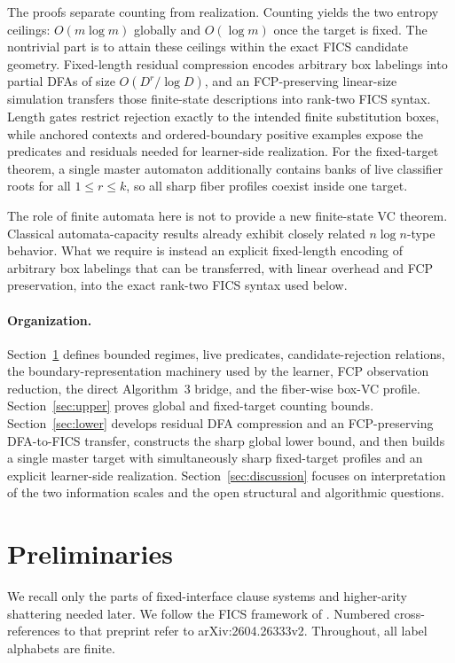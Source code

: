 \documentclass[11pt]{article}
\theoremstyle{definition}
\theoremstyle{remark}
\begin{document}
The proofs separate counting from realization.  Counting yields the two
entropy ceilings: \(O(m\log m)\) globally and \(O(\log m)\) once the target is
fixed.  The nontrivial part is to attain these ceilings within the exact FICS
candidate geometry.  Fixed-length residual compression encodes arbitrary box
labelings into partial DFAs of size \(O(D^r/\log D)\), and an FCP-preserving
linear-size simulation transfers those finite-state descriptions into rank-two
FICS syntax.  Length gates restrict rejection exactly to the intended finite
substitution boxes, while anchored contexts and ordered-boundary positive
examples expose the predicates and residuals needed for learner-side
realization.  For the fixed-target theorem, a single master automaton
additionally contains banks of live classifier roots for all \(1\le r\le k\),
so all sharp fiber profiles coexist inside one target.

The role of finite automata here is not to provide a new finite-state VC
theorem.  Classical automata-capacity results already exhibit closely related
\(n\log n\)-type behavior.  What we require is instead an explicit fixed-length
encoding of arbitrary box labelings that can be transferred, with linear
overhead and FCP preservation, into the exact rank-two FICS syntax used below.

\paragraph{Organization.}
Section~\ref{sec:prelim} defines bounded regimes, live predicates,
candidate-rejection relations, the boundary-representation machinery used by
the learner, FCP observation reduction, the direct Algorithm~3 bridge, and the
fiber-wise box-VC profile.  Section~\ref{sec:upper}
proves global and fixed-target counting bounds.  Section~\ref{sec:lower}
develops residual DFA compression and an FCP-preserving DFA-to-FICS transfer,
constructs the sharp global lower bound, and then builds a single master target
with simultaneously sharp fixed-target profiles and an explicit learner-side
realization.  Section~\ref{sec:discussion} focuses on interpretation of the
two information scales and the open structural and algorithmic questions.

\section{Preliminaries}
\label{sec:prelim}

We recall only the parts of fixed-interface clause systems and higher-arity
shattering needed later. We follow the FICS framework of
\cite{ShoudaiEtAl2026}. Numbered cross-references to that preprint refer to
arXiv:2604.26333v2. Throughout, all label alphabets are finite.
\end{document}
